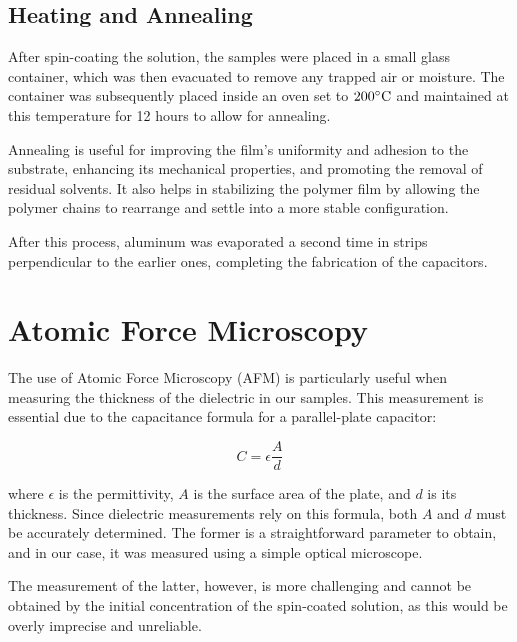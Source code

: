 \subsection{Heating and Annealing}

After spin-coating the solution, the samples were placed in a small glass container, which was then evacuated to remove any trapped air or moisture. The container was subsequently placed inside an oven set to $200 \degree \text{C}$ and maintained at this temperature for 12 hours to allow for annealing.

Annealing is useful for improving the film's uniformity and adhesion to the substrate, enhancing its mechanical properties, and promoting the removal of residual solvents. It also helps in stabilizing the polymer film by allowing the polymer chains to rearrange and settle into a more stable configuration.


After this process, aluminum was evaporated a second time in strips perpendicular to the earlier ones, completing the fabrication of the capacitors.


\section{Atomic Force Microscopy}

The use of Atomic Force Microscopy (AFM) is particularly useful when measuring the thickness of the dielectric in our samples. This measurement is essential due to the capacitance formula for a parallel-plate capacitor:

\[
C = \epsilon \frac{A}{d}
\]

where $\epsilon$ is the permittivity, $A$ is the surface area of the plate, and $d$ is its thickness. Since dielectric measurements rely on this formula, both $A$ and $d$ must be accurately determined. The former is a straightforward parameter to obtain, and in our case, it was measured using a simple optical microscope. %


The measurement of the latter, however, is more challenging and cannot be obtained by the initial concentration of the spin-coated solution, as this would be overly imprecise and unreliable.


